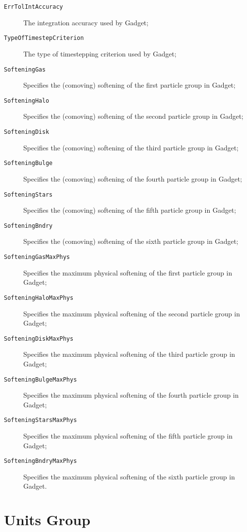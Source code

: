 \begin{description}
 \item [{\tt ErrTolIntAccuracy}] The integration accuracy used by {\sc Gadget};
 \item [{\tt TypeOfTimestepCriterion}] The type of timestepping criterion used by {\sc Gadget};
 \item [{\tt SofteningGas}] Specifies the (comoving) softening of the first particle group in {\sc Gadget};
 \item [{\tt SofteningHalo}] Specifies the (comoving) softening of the second particle group in {\sc Gadget};
 \item [{\tt SofteningDisk}] Specifies the (comoving) softening of the third particle group in {\sc Gadget};
 \item [{\tt SofteningBulge}] Specifies the (comoving) softening of the fourth particle group in {\sc Gadget};
 \item [{\tt SofteningStars}] Specifies the (comoving) softening of the fifth particle group in {\sc Gadget};
 \item [{\tt SofteningBndry}] Specifies the (comoving) softening of the sixth particle group in {\sc Gadget};
 \item [{\tt SofteningGasMaxPhys}] Specifies the maximum physical softening of the first particle group in {\sc Gadget};
 \item [{\tt SofteningHaloMaxPhys}] Specifies the maximum physical softening of the second particle group in {\sc Gadget};
 \item [{\tt SofteningDiskMaxPhys}] Specifies the maximum physical softening of the third particle group in {\sc Gadget};
 \item [{\tt SofteningBulgeMaxPhys}] Specifies the maximum physical softening of the fourth particle group in {\sc Gadget};
 \item [{\tt SofteningStarsMaxPhys}] Specifies the maximum physical softening of the fifth particle group in {\sc Gadget};
 \item [{\tt SofteningBndryMaxPhys}] Specifies the maximum physical softening of the sixth particle group in {\sc Gadget}.
\end{description}

\section{Units Group}\label{sec:UnitsGroup}

